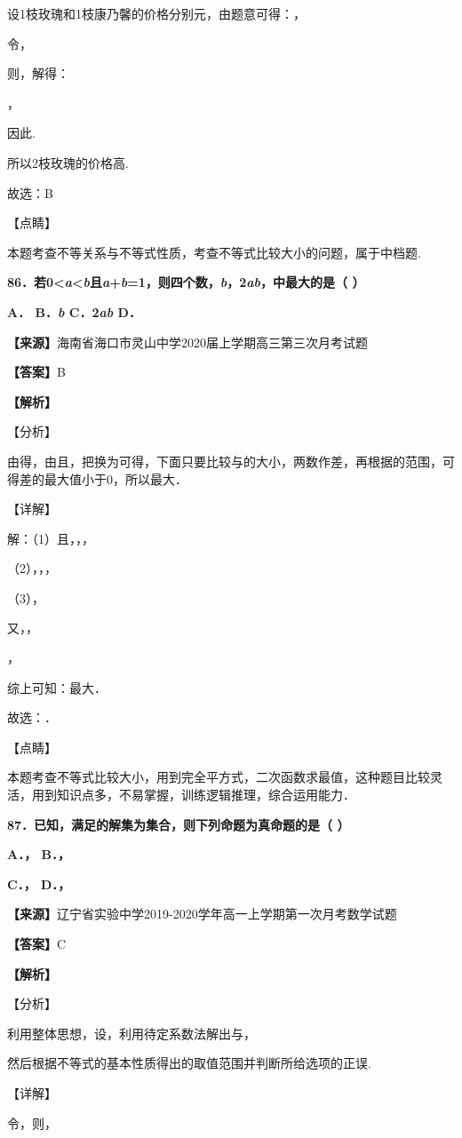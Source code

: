\documentclass[
]{article}
\begin{document}
设1枝玫瑰和1枝康乃馨的价格分别元，由题意可得：，

令，

则，解得：

，

因此.

所以2枝玫瑰的价格高.

故选：B

【点睛】

本题考查不等关系与不等式性质，考查不等式比较大小的问题，属于中档题.

\textbf{86．若0\textless{}\emph{a}\textless{}\emph{b}且\emph{a}+\emph{b}=1，则四个数，\emph{b}，2\emph{ab}，中最大的是（
）}

\textbf{A． B．\emph{b} C．2\emph{ab} D．}

\textbf{【来源】}海南省海口市灵山中学2020届上学期高三第三次月考试题

\textbf{【答案】}B

\textbf{【解析】}

【分析】

由得，由且，把换为可得，下面只要比较与的大小，两数作差，再根据的范围，可得差的最大值小于0，所以最大．

【详解】

解：（1）且，，，

（2），，，

（3），

又，，

，

综上可知：最大．

故选：．

【点睛】

本题考查不等式比较大小，用到完全平方式，二次函数求最值，这种题目比较灵活，用到知识点多，不易掌握，训练逻辑推理，综合运用能力．

\textbf{87．已知，满足的解集为集合，则下列命题为真命题的是（ ）}

\textbf{A．， B．，}

\textbf{C．， D．，}

\textbf{【来源】}辽宁省实验中学2019-2020学年高一上学期第一次月考数学试题

\textbf{【答案】}C

\textbf{【解析】}

【分析】

利用整体思想，设，利用待定系数法解出与，

然后根据不等式的基本性质得出的取值范围并判断所给选项的正误.

【详解】

令，则，
\end{document}
